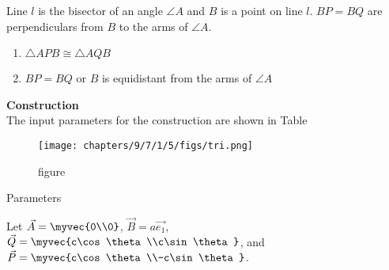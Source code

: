 
\item Line $l$ is the bisector of an angle $\angle{A}$ and $B$ is a point on line $l$. $BP = BQ$ are perpendiculars from $B$ to the arms of $\angle{A}$. 
\begin{enumerate}
\item $\triangle{APB} \cong \triangle{AQB}$
\item $BP = BQ$ or $B$ is equidistant from the arms of $\angle{A}$
\end{enumerate}

\textbf{Construction}\\
The input parameters for the construction are shown in Table 
\begin{figure}[H]
    \begin{center}
     \texttt{[image: chapters/9/7/1/5/figs/tri.png]}
    \caption{figure}
    \label{fig:chapters/9/7/1/5/figs/tri.png}   
    \end{center}
\end{figure}

\begin{table}[H]
	  \centering
	  
	  \caption{Parameters}
	  \label{Table}
\end{table}

Let $\vec{A} = \myvec{0\\0}$, $\vec{B} = a\vec{e_1}$, $\vec{Q} = \myvec{c\cos\theta\\c\sin\theta}$, and $\vec{P} = \myvec{c\cos\theta\\-c\sin\theta}$.


